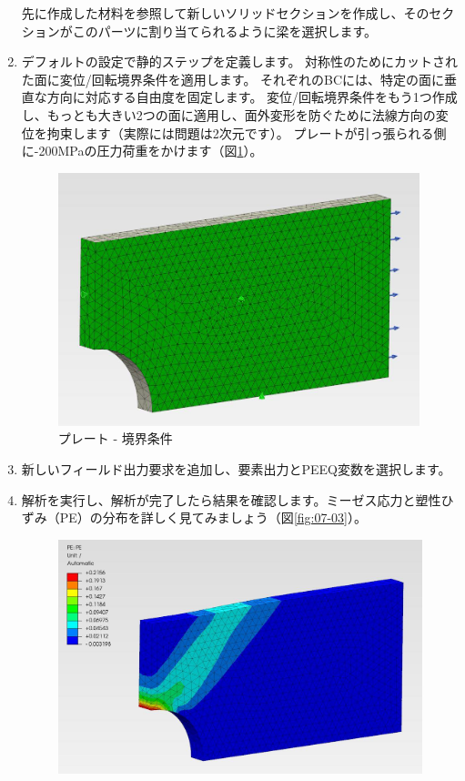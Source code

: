 \begin{enumerate}
	\vspace{-\baselineskip}
  先に作成した材料を参照して新しいソリッドセクションを作成し、そのセクションがこのパーツに割り当てられるように梁を選択します。
\item
  デフォルトの設定で静的ステップを定義します。
  対称性のためにカットされた面に変位/回転境界条件を適用します。
  それぞれのBCには、特定の面に垂直な方向に対応する自由度を固定します。
  変位/回転境界条件をもう1つ作成し、もっとも大きい2つの面に適用し、面外変形を防ぐために法線方向の変位を拘束します（実際には問題は2次元です）。
  プレートが引っ張られる側に-200MPaの圧力荷重をかけます（図\ref{fig:07-02}）。
	\begin{figure}[H]
	\centering
	\includegraphics[width=105mm]{fig/07-02.png}
	\caption{プレート - 境界条件}
	\label{fig:07-02}
	\end{figure}
	\vspace{-\baselineskip}
\item
  新しいフィールド出力要求を追加し、要素出力とPEEQ変数を選択します。
\item
  解析を実行し、解析が完了したら結果を確認します。ミーゼス応力と塑性ひずみ（PE）の分布を詳しく見てみましょう（図\ref{fig:07-03}）。
	\begin{figure}[H]
	\centering
	\includegraphics[width=115mm]{fig/07-03.png}

\end{figure}
\end{enumerate}
